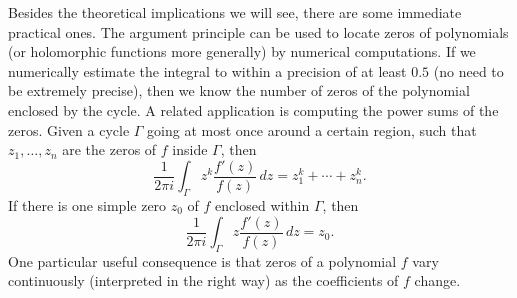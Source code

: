 \documentclass[12pt,openany]{book}
\theoremstyle{plain}
\theoremstyle{remark}
\theoremstyle{definition}
\theoremstyle{exercise}
\theoremstyle{example}
\begin{document}
Besides the theoretical implications we will see,
there are some immediate practical ones.
The argument principle can be used to locate zeros of polynomials
(or holomorphic functions more generally)
by numerical computations.  If we numerically estimate the integral to
within a precision of at least $0.5$ (no need to be extremely precise),
then we know the number of zeros 
of the polynomial enclosed by the cycle.
A related application is computing the power sums of the zeros.
Given a cycle $\Gamma$ going at most
once around a certain region, such that $z_1,\ldots,z_n$ are the zeros of $f$
inside $\Gamma$, then
\begin{equation*}
\frac{1}{2\pi i}
\int_\Gamma z^k \frac{f'(z)}{f(z)} \, dz
=
z_1^k + \cdots + z_n^k .
\end{equation*}
If there is one simple zero $z_0$ of
$f$ enclosed within $\Gamma$, then
\begin{equation*}
\frac{1}{2\pi i}
\int_\Gamma z \frac{f'(z)}{f(z)} \, dz
=
z_0 .
\end{equation*}
One particular useful consequence is that zeros of a polynomial $f$ vary continuously
(interpreted in the right way) as the coefficients of $f$ change.
\end{document}
